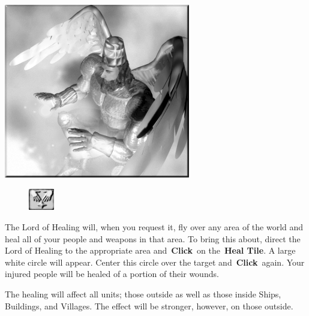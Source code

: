 \begin{center}
	\includegraphics[width=1\linewidth]{Ahealinglord}
\end{center}

\begin{figure}
	\vspace{-20pt}
	\begin{center}
		\includegraphics[width=0.1\textwidth]{Theal}
	\end{center}
	\vspace{-20pt}
\end{figure}

The Lord of Healing will, when you request it, fly over any area of the world and heal all of your people and weapons in that area. To bring this about, direct the Lord of Healing to the appropriate area and \textbf{Click} on the \textbf{Heal Tile}. A large white circle will appear. Center this circle over the target and \textbf{Click} again. Your injured people will be healed of a portion of their wounds.

The healing will affect all units; those outside as well as those inside Ships, Buildings, and Villages. The effect will be stronger, however, on those outside.

